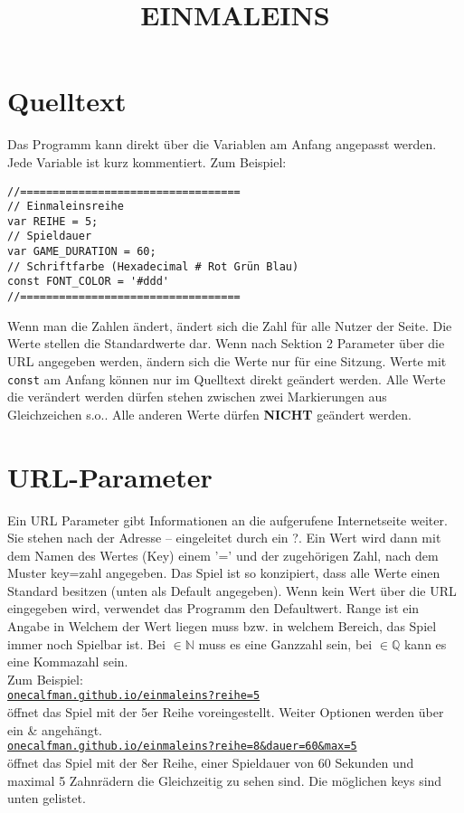 \documentclass[]{article}
\title{EINMALEINS}
\begin{document}
\maketitle

\begin{multicols}{2}

\section{Quelltext}

Das Programm kann direkt über die Variablen am Anfang angepasst werden. Jede Variable ist kurz kommentiert.
Zum Beispiel:

\begin{verbatim}
//==================================
// Einmaleinsreihe
var REIHE = 5;            
// Spieldauer
var GAME_DURATION = 60;
// Schriftfarbe (Hexadecimal # Rot Grün Blau)
const FONT_COLOR = '#ddd'
//==================================
\end{verbatim} 

	Wenn man die Zahlen ändert, ändert sich die Zahl für alle Nutzer der Seite. Die Werte stellen die Standardwerte dar. Wenn nach Sektion 2 Parameter über die URL angegeben werden, ändern sich die Werte nur für eine Sitzung. Werte mit \texttt{const} am Anfang können nur im Quelltext direkt geändert werden. Alle Werte die verändert werden dürfen stehen zwischen zwei Markierungen aus Gleichzeichen s.o.. Alle anderen Werte dürfen \textbf{NICHT} geändert werden.

\section{URL-Parameter}

Ein URL Parameter gibt Informationen an die aufgerufene Internetseite weiter. Sie stehen nach der Adresse -- eingeleitet durch ein 
?. Ein Wert wird dann mit dem Namen des Wertes (Key) einem '=' und der zugehörigen Zahl, nach dem Muster key=zahl angegeben. Das Spiel ist so konzipiert, dass alle Werte einen Standard besitzen (unten als Default angegeben). Wenn kein Wert über die URL eingegeben wird, verwendet das Programm den Defaultwert. Range ist ein Angabe in Welchem der Wert liegen muss bzw. in welchem Bereich, das Spiel immer noch Spielbar ist. Bei $\in \mathbb{N} $ muss es eine Ganzzahl sein, bei $\in \mathbb{Q} $ kann es eine Kommazahl sein.\\
Zum Beispiel: \\
\texttt{\href{onecalfman.github.io/einmaleins?reihe=5}{onecalfman.github.io/einmaleins?reihe=5}} \\
öffnet das Spiel mit der 5er Reihe voreingestellt.
Weiter Optionen werden über ein \& angehängt. \\
\texttt{\href{onecalfman.github.io/einmaleins?reihe=8\&dauer=60\&max=5}{onecalfman.github.io/einmaleins?reihe=8\&dauer=60\&max=5}} \\
öffnet das Spiel mit der 8er Reihe, einer Spieldauer von 60 Sekunden und maximal 5 Zahnrädern die Gleichzeitig zu sehen sind. Die möglichen keys sind unten gelistet.

\end{multicols}
\end{document}
